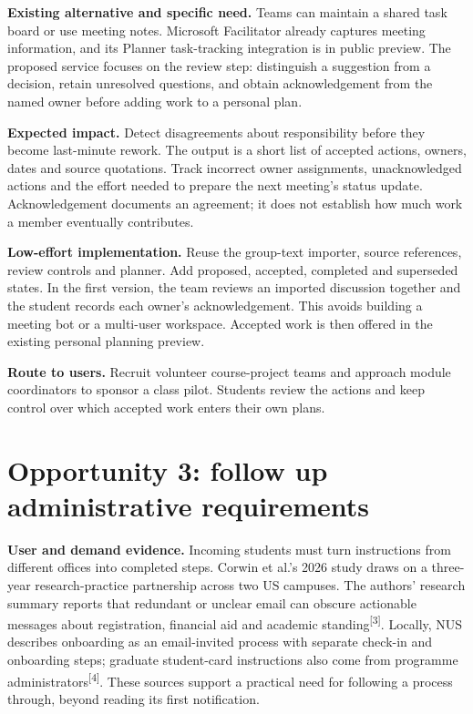 \documentclass[11pt,a4paper]{article}
\newcommand{\src}[1]{\textsuperscript{[#1]}}
\begin{document}
\textbf{Existing alternative and specific need.} Teams can maintain a shared
task board or use meeting notes. Microsoft Facilitator already captures meeting
information, and its Planner task-tracking integration is in public preview.
The proposed service focuses on the review step: distinguish a suggestion from
a decision, retain unresolved questions, and obtain acknowledgement from the
named owner before adding work to a personal plan.

\textbf{Expected impact.} Detect disagreements about responsibility before they
become last-minute rework. The output is a short list of accepted actions,
owners, dates and source quotations. Track incorrect owner assignments,
unacknowledged actions and the effort needed to prepare the next meeting's
status update. Acknowledgement documents an agreement; it does not establish
how much work a member eventually contributes.

\textbf{Low-effort implementation.} Reuse the group-text importer, source
references, review controls and planner. Add proposed, accepted, completed and
superseded states. In the first version, the team reviews an imported discussion
together and the student records each owner's acknowledgement. This avoids
building a meeting bot or a multi-user workspace. Accepted work is then offered
in the existing personal planning preview.

\textbf{Route to users.} Recruit volunteer course-project teams and approach
module coordinators to sponsor a class pilot. Students review the actions and
keep control over which accepted work enters their own plans.

\section{Opportunity 3: follow up administrative requirements}
\textbf{User and demand evidence.} Incoming students must turn instructions from
different offices into completed steps. Corwin et al.'s 2026 study draws on a
three-year research-practice partnership across two US campuses. The authors'
research summary reports that redundant or unclear email can obscure actionable
messages about registration, financial aid and academic standing\src{3}.
Locally, NUS describes onboarding as an email-invited process with separate
check-in and onboarding steps; graduate student-card instructions also come
from programme administrators\src{4}. These sources support a practical need
for following a process through, beyond reading its first notification.
\end{document}
